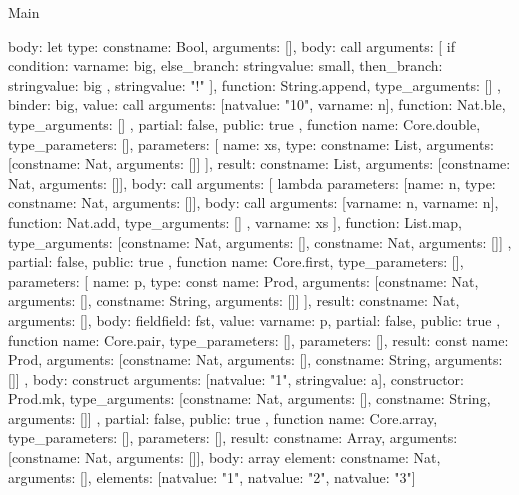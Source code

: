 \begin{lexlean}{Main}
\begin{toolingmodule}
{{      body: let{
        type: const{name: Bool, arguments: []},
        body: call{
          arguments: [
            if{
              condition: var{name: big},
              else_branch: string{value: small},
              then_branch: string{value: big}
            },
            string{value: "!"}
          ],
          function: String.append,
          type_arguments: []
        },
        binder: big,
        value: call{
          arguments: [nat{value: "10"}, var{name: n}],
          function: Nat.ble,
          type_arguments: []
        }
      },
      partial: false,
      public: true
    },
    function{
      name: Core.double,
      type_parameters: [],
      parameters: [
        {name: xs, type: const{name: List, arguments: [const{name: Nat, arguments: []}]}}
      ],
      result: const{name: List, arguments: [const{name: Nat, arguments: []}]},
      body: call{
        arguments: [
          lambda{
            parameters: [{name: n, type: const{name: Nat, arguments: []}}],
            body: call{
              arguments: [var{name: n}, var{name: n}],
              function: Nat.add,
              type_arguments: []
            }
          },
          var{name: xs}
        ],
        function: List.map,
        type_arguments: [const{name: Nat, arguments: []}, const{name: Nat, arguments: []}]
      },
      partial: false,
      public: true
    },
    function{
      name: Core.first,
      type_parameters: [],
      parameters: [
        {
          name: p,
          type: const{
            name: Prod,
            arguments: [const{name: Nat, arguments: []}, const{name: String, arguments: []}]
          }
        }
      ],
      result: const{name: Nat, arguments: []},
      body: field{field: fst, value: var{name: p}},
      partial: false,
      public: true
    },
    function{
      name: Core.pair,
      type_parameters: [],
      parameters: [],
      result: const{
        name: Prod,
        arguments: [const{name: Nat, arguments: []}, const{name: String, arguments: []}]
      },
      body: construct{
        arguments: [nat{value: "1"}, string{value: a}],
        constructor: Prod.mk,
        type_arguments: [const{name: Nat, arguments: []}, const{name: String, arguments: []}]
      },
      partial: false,
      public: true
    },
    function{
      name: Core.array,
      type_parameters: [],
      parameters: [],
      result: const{name: Array, arguments: [const{name: Nat, arguments: []}]},
      body: array{
        element: const{name: Nat, arguments: []},
        elements: [nat{value: "1"}, nat{value: "2"}, nat{value: "3"}]
}}}
\end{toolingmodule}
\end{lexlean}

